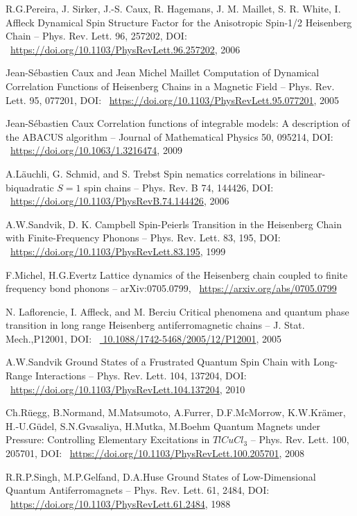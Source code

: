 \documentclass[11pt]{article}
\begin{document}
\begin{thebibliography}{3}
R.G.Pereira, J. Sirker, J.-S. Caux, R. Hagemans, J. M. Maillet, S. R. White, I. Affleck Dynamical Spin Structure Factor for the Anisotropic Spin-1/2 Heisenberg Chain -- Phys. Rev. Lett. 96, 257202, DOI: ~\url{https://doi.org/10.1103/PhysRevLett.96.257202}, 2006

Jean-Sébastien Caux and Jean Michel Maillet Computation of Dynamical Correlation Functions of Heisenberg Chains in a Magnetic Field -- Phys. Rev. Lett. 95, 077201, DOI: ~\url{https://doi.org/10.1103/PhysRevLett.95.077201}, 2005

Jean-Sébastien Caux Correlation functions of integrable models: A description of the ABACUS algorithm -- Journal of Mathematical Physics 50, 095214, DOI: ~\url{https://doi.org/10.1063/1.3216474}, 2009

A.Läuchli, G. Schmid, and S. Trebst Spin nematics correlations in bilinear-biquadratic $S=1$ spin chains -- Phys. Rev. B 74, 144426, DOI: ~\url{https://doi.org/10.1103/PhysRevB.74.144426}, 2006

A.W.Sandvik, D. K. Campbell Spin-Peierls Transition in the Heisenberg Chain with Finite-Frequency Phonons -- Phys. Rev. Lett. 83, 195, DOI: ~\url{https://doi.org/10.1103/PhysRevLett.83.195}, 1999

F.Michel, H.G.Evertz Lattice dynamics of the Heisenberg chain coupled to finite frequency bond phonons -- arXiv:0705.0799, ~\url{https://arxiv.org/abs/0705.0799}

N. Laflorencie, I. Affleck, and M. Berciu Critical phenomena and quantum phase transition in long range Heisenberg antiferromagnetic chains -- J. Stat. Mech.,P12001, DOI: ~\url{	10.1088/1742-5468/2005/12/P12001}, 2005

A.W.Sandvik Ground States of a Frustrated Quantum Spin Chain with Long-Range Interactions -- Phys. Rev. Lett. 104, 137204, DOI: ~\url{https://doi.org/10.1103/PhysRevLett.104.137204}, 2010

Ch.Rüegg, B.Normand, M.Matsumoto, A.Furrer, D.F.McMorrow, K.W.Krämer, H.-U.Güdel, S.N.Gvasaliya, H.Mutka, M.Boehm Quantum Magnets under Pressure: Controlling Elementary Excitations in $TlCuCl_3$ -- Phys. Rev. Lett. 100, 205701, DOI: ~\url{https://doi.org/10.1103/PhysRevLett.100.205701}, 2008

R.R.P.Singh, M.P.Gelfand, D.A.Huse Ground States of Low-Dimensional Quantum Antiferromagnets --  Phys. Rev. Lett. 61, 2484, DOI: ~\url{https://doi.org/10.1103/PhysRevLett.61.2484}, 1988


\end{thebibliography}
\end{document}
